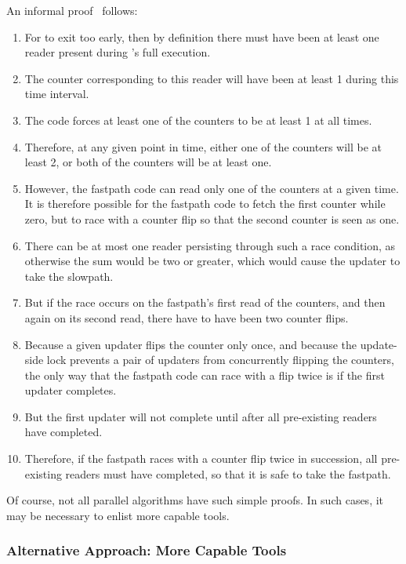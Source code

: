 An informal proof~\cite{PaulMcKenney2007QRCUpatch}
follows:

\begin{enumerate}
\item	For  to exit too early, then
	by definition there must have been at least one reader
	present during 's full
	execution.
\item	The counter corresponding to this reader will have been
	at least 1 during this time interval.
\item	The  code forces at least one
	of the counters to be at least 1 at all times.
\item	Therefore, at any given point in time, either one of the
	counters will be at least 2, or both of the counters will
	be at least one.
\item	However, the  fastpath code
	can read only one of the counters at a given time.
	It is therefore possible for the fastpath code to fetch
	the first counter while zero, but to race with a counter
	flip so that the second counter is seen as one.
\item	There can be at most one reader persisting through such
	a race condition, as otherwise the sum would be two or
	greater, which would cause the updater to take the slowpath.
\item	But if the race occurs on the fastpath's first read of the
	counters, and then again on its second read, there have
	to have been two counter flips.
\item	Because a given updater flips the counter only once, and
	because the update-side lock prevents a pair of updaters
	from concurrently flipping the counters, the only way that
	the fastpath code can race with a flip twice is if the
	first updater completes.
\item	But the first updater will not complete until after all
	pre-existing readers have completed.
\item	Therefore, if the fastpath races with a counter flip
	twice in succession, all pre-existing readers must have
	completed, so that it is safe to take the fastpath.
\end{enumerate}

Of course, not all parallel algorithms have such simple proofs.
In such cases, it may be necessary to enlist more capable tools.

\subsubsection{Alternative Approach: More Capable Tools}
\label{sec:formal:Alternative Approach: More Capable Tools}

